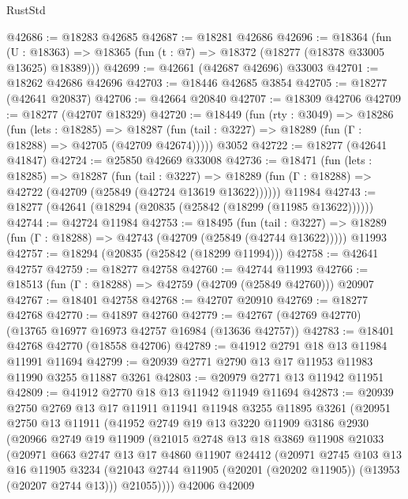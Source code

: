 \begin{lexlean}{RustStd}
\begin{coremodule}
@42686 := @18283 @42685
@42687 := @18281 @42686
@42696 := @18364
    (fun (U : @18363) => @18365 (fun (t : @7) => @18372 (@18277 (@18378 @33005 @13625) @18389)))
@42699 := @42661 (@42687 @42696) @33003
@42701 := @18262 @42686 @42696
@42703 := @18446 @42685 @3854
@42705 := @18277 (@42641 @20837)
@42706 := @42664 @20840
@42707 := @18309 @42706
@42709 := @18277 (@42707 @18329)
@42720 := @18449
    (fun (rty : @3049) =>
    @18286
      (fun (lets : @18285) =>
      @18287 (fun (tail : @3227) => @18289 (fun (Γ : @18288) => @42705 (@42709 @42674)))))
    @3052
@42722 := @18277 (@42641 @41847)
@42724 := @25850 @42669 @33008
@42736 := @18471
    (fun (lets : @18285) =>
    @18287
      (fun (tail : @3227) =>
      @18289 (fun (Γ : @18288) => @42722 (@42709 (@25849 (@42724 @13619 @13622))))))
    @11984
@42743 := @18277 (@42641 (@18294 (@20835 (@25842 (@18299 (@11985 @13622))))))
@42744 := @42724 @11984
@42753 := @18495
    (fun (tail : @3227) => @18289 (fun (Γ : @18288) => @42743 (@42709 (@25849 (@42744 @13622)))))
    @11993
@42757 := @18294 (@20835 (@25842 (@18299 @11994)))
@42758 := @42641 @42757
@42759 := @18277 @42758
@42760 := @42744 @11993
@42766 := @18513 (fun (Γ : @18288) => @42759 (@42709 (@25849 @42760))) @20907
@42767 := @18401 @42758
@42768 := @42707 @20910
@42769 := @18277 @42768
@42770 := @41897 @42760
@42779 := @42767 (@42769 @42770) (@13765 @16977 @16973 @42757 @16984 (@13636 @42757))
@42783 := @18401 @42768 @42770 (@18558 @42706)
@42789 := @41912 @2791 @18 @13 @11984 @11991 @11694
@42799 := @20939 @2771 @2790 @13 @17 @11953 @11983 @11990 @3255 @11887 @3261
@42803 := @20979 @2771 @13 @11942 @11951
@42809 := @41912 @2770 @18 @13 @11942 @11949 @11694
@42873 := @20939
    @2750
    @2769
    @13
    @17
    @11911
    @11941
    @11948
    @3255
    @11895
    @3261
    (@20951
      @2750
      @13
      @11911
      (@41952
        @2749
        @19
        @13
        @3220
        @11909
        @3186
        @2930
        (@20966
          @2749
          @19
          @11909
          (@21015
            @2748
            @13
            @18
            @3869
            @11908
            @21033
            (@20971
              @663
              @2747
              @13
              @17
              @4860
              @11907
              @24412
              (@20971
                @2745
                @103
                @13
                @16
                @11905
                @3234
                (@21043 @2744 @11905 (@20201 (@20202 @11905)) (@13953 (@20207 @2744 @13)))
                @21055))))
        @42006
        @42009

\end{coremodule}
\end{lexlean}
